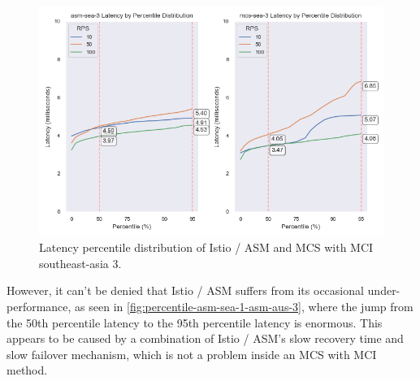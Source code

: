 \begin{figure}
	\centering
	\includegraphics[width=1\textwidth]{assets/plots/percentile-asm-sea-3-mc-sea-3.png}
    \caption{Latency percentile distribution of Istio / ASM and MCS with MCI southeast-asia 3.}
	\label{fig:percentile-asm-sea-3-mc-sea-3}
\end{figure}



However, it can't be denied that Istio / ASM suffers from its occasional under-performance, as seen in \autoref{fig:percentile-asm-sea-1-asm-aus-3}, where the jump from the 50th percentile latency to the 95th percentile latency is enormous. This appears to be caused by a combination of  Istio / ASM's slow recovery time and slow failover mechanism, which is not a problem inside an MCS with MCI method.

